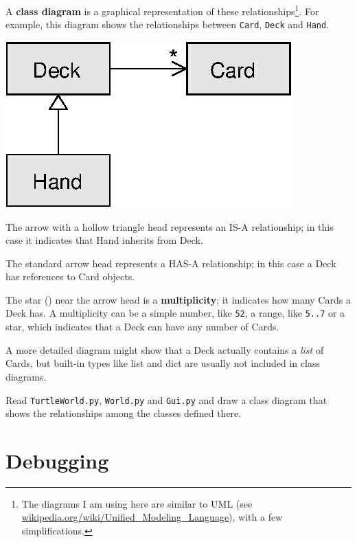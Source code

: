 
A {\bf class diagram} is a graphical representation of these
relationships\footnote{The diagrams I am using here are similar to UML
  (see \url{wikipedia.org/wiki/Unified_Modeling_Language}), with a few
  simplifications.}.  For example, this diagram shows the
relationships between {\tt Card}, {\tt Deck} and {\tt Hand}.

\beforefig
\centerline{\includegraphics{figs/class1.eps}}
\afterfig

The arrow with a hollow triangle head represents an IS-A
relationship; in this case it indicates that Hand inherits
from Deck.

The standard arrow head represents a HAS-A
relationship; in this case a Deck has references to Card
objects.


The star ({\tt *}) near the arrow head is a 
{\bf multiplicity}; it indicates how many Cards a Deck has.
A multiplicity can be a simple number, like {\tt 52}, a range,
like {\tt 5..7} or a star, which indicates that a Deck can
have any number of Cards.

A more detailed diagram might show that a Deck actually
contains a {\em list} of Cards, but built-in types
like list and dict are usually not included in class diagrams.

\begin{exercise}
Read {\tt TurtleWorld.py}, {\tt World.py} and {\tt Gui.py}
and draw a class diagram that shows the relationships among
the classes defined there.
\end{exercise}


\section{Debugging}

